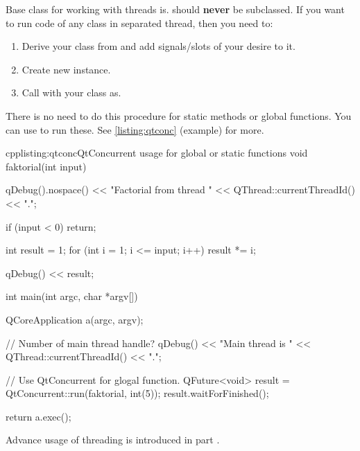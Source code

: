 Base class for working with threads is. \citep[QThread class]{various:qtdoc}   should \textbf{never} be subclassed. If you want to run code of any class in separated thread, then you need to:
\begin{enumerate}
\item Derive your class from and add signals/slots of your desire to it.
\item Create new instance.
\item Call with your class as.
\end{enumerate}

There is no need to do this procedure for static methods or global functions. You can use to run these. \citep[QtConcurrent]{various:qtdoc} See \autoref{listing:qtconc} (example) for more.

\begin{fdoccode}{cpp}{listing:qtconc}{QtConcurrent usage for global or static functions}
void faktorial(int input) {
    qDebug().nospace() << "Factorial from thread " << QThread::currentThreadId() << ".";

    if (input < 0) {
		return;
    }

    int result = 1;
    for (int i = 1; i <= input; i++) {
		result *= i;
    }

    qDebug() << result;
}


int main(int argc, char *argv[]) {
    QCoreApplication a(argc, argv);

    // Number of main thread handle?
    qDebug() << "Main thread is " << QThread::currentThreadId() << ".";

    // Use QtConcurrent for glogal function.
    QFuture<void> result = QtConcurrent::run(faktorial, int(5));
    result.waitForFinished();

    return a.exec();
}
\end{fdoccode}

Advance usage of threading is introduced in part .